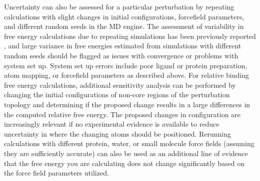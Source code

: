 \documentclass[9pt,bestpractices]{livecoms}
\begin{document}
Uncertainty can also be assessed for a particular perturbation by repeating calculations with slight changes in initial configurations, forcefield parameters, and different random seeds in the MD engine. 
The assessment of variability in free energy calculations due to repeating simulations has been previously reported \cite{aldeghi2019accurate}, and large variance in free energies estimated from simulations with different random seeds should be flagged as issues with convergence or problems with system set up. 
System set up errors include poor ligand or protein preparation, atom mapping, or forcefield parameters as described above.
For relative binding free energy calculations, additional sensitivity analysis can be performed by changing the initial configurations of non-core regions of the perturbation topology and determining if the proposed change results in a large differences in the computed relative free energy.
The proposed changes in configuration are increasingly relevant if no experimental evidence is available to reduce uncertainty in where the changing atoms should be positioned.
Rerunning calculations with different protein, water, or small molecule force fields (assuming they are sufficiently accurate) can also be used as an additional line of evidence that the free energy you are calculating does not change significantly based on the force field parameters utilized.
\end{document}
